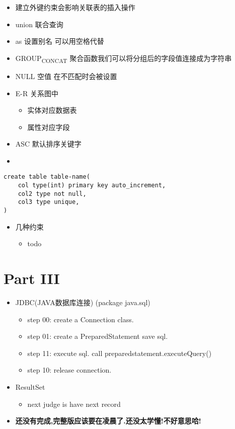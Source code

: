 \documentclass[11pt]{article}
\begin{document}
\begin{itemize}
\begin{itemize}
\item 建立外键约束会影响关联表的插入操作
\item union 联合查询
\item as    设置别名 可以用空格代替
\item GROUP\textsubscript{CONCAT} 聚合函数我们可以将分组后的字段值连接成为字符串
\item NULL  空值 在不匹配时会被设置
\item E-R 关系图中
\begin{itemize}
\item 实体对应数据表
\item 属性对应字段
\end{itemize}
\item ASC  默认排序关键字
\item
\end{itemize}
\end{itemize}
\begin{verbatim}
create table table-name(
    col type(int) primary key auto_increment,
    col2 type not null,
    col3 type unique,
)
\end{verbatim}
\begin{itemize}
\item 几种约束
\begin{itemize}
\item todo
\end{itemize}
\end{itemize}
\section{Part III}
\label{sec:org4afce88}
\begin{itemize}
\item JDBC(JAVA数据库连接) (package java.sql)
\begin{itemize}
\item step 00: create a Connection class.
\item step 01: create a PreparedStatement save sql.
\item step 11: execute sql. call preparedstatement.executeQuery()
\item step 10: release connection.
\end{itemize}
\item ResultSet
\begin{itemize}
\item next   judge is have next record
\end{itemize}
\item \textbf{还没有完成,完整版应该要在凌晨了.还没太学懂!不好意思哈!}
\end{itemize}
\end{document}
